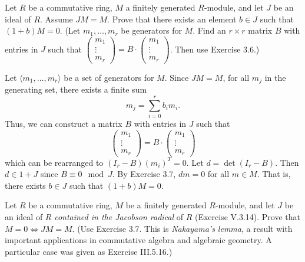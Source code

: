 \documentclass[../../master.tex]{subfiles}
\begin{document}
\begin{problem}
    Let $R$ be a commutative ring, $M$ a finitely generated $R$-module, and let $J$ be an ideal of $R$.
    Assume $JM = M$.
    Prove that there exists an element $b \in J$ such that $(1 + b)M = 0$.
    (Let $m_1, \ldots, m_r$ be generators for $M$.
    Find an $r \times r$ matrix $B$ with entries in $J$ such that $
    \begin{pmatrix}
        m_1 \\
        \vdots \\
        m_r
    \end{pmatrix} = B \cdot 
    \begin{pmatrix}
        m_1 \\
        \vdots \\
        m_r
    \end{pmatrix}$.
    Then use Exercise 3.6.)
\end{problem}

\begin{solution}
    Let $\langle m_1, \ldots, m_r \rangle$ be a set of generators for $M$.
    Since $JM = M$, for all $m_j$ in the generating set, there exists a finite sum
    \[
        m_j = \sum_{i=0}^{r} b_im_i.
    \]
    Thus, we can construct a matrix $B$ with entries in $J$ such that
    \[
    \begin{pmatrix}
        m_1 \\
        \vdots \\
        m_r
    \end{pmatrix} =
    B \cdot
    \begin{pmatrix}
        m_1 \\
        \vdots \\
        m_r
    \end{pmatrix}
    \]
    which can be rearranged to $(I_r - B) (m_i)^{T} = 0$.
    Let $d = \det(I_r - B)$.
    Then $d \in 1 + J$ since $B \equiv 0 \mod J$.
    By Exercise 3.7, $d m = 0$ for all $m \in M$.
    That is, there exists $b \in J$ such that $(1 + b)M = 0$.
\end{solution}

\begin{problem}
    Let $R$ be a commutative ring, $M$ be a finitely generated $R$-module, and let $J$ be an ideal of $R$ \textit{contained in the Jacobson radical} of $R$ (Exercise V.3.14).
    Prove that $M = 0 \Longleftrightarrow JM = M$.
    (Use Exercise 3.7.
    This is \textit{Nakayama's lemma}, a result with important applications in commutative algebra and algebraic geometry.
    A particular case was given as Exercise III.5.16.)
\end{problem}
\end{document}
